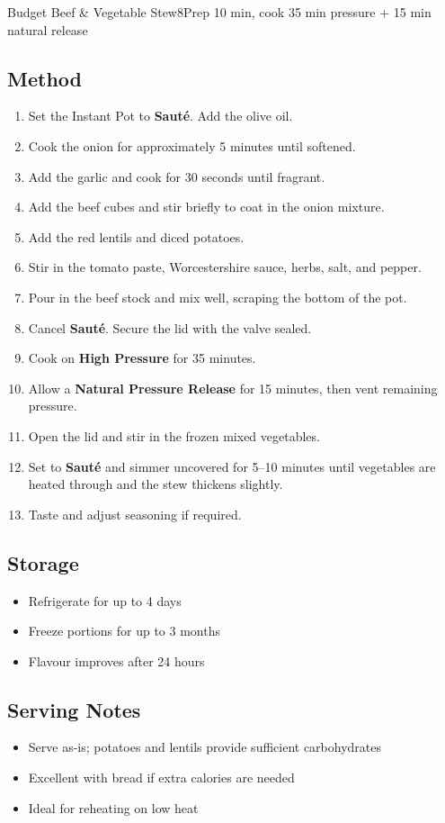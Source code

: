 \begin{recipebox}{Budget Beef \& Vegetable Stew}{8}{Prep 10 min, cook 35 min pressure + 15 min natural release}
\subsection*{Method}
\begin{enumerate}
    \item Set the Instant Pot to \textbf{Sauté}. Add the olive oil.
    \item Cook the onion for approximately 5 minutes until softened.
    \item Add the garlic and cook for 30 seconds until fragrant.
    \item Add the beef cubes and stir briefly to coat in the onion mixture.
    \item Add the red lentils and diced potatoes.
    \item Stir in the tomato paste, Worcestershire sauce, herbs, salt, and pepper.
    \item Pour in the beef stock and mix well, scraping the bottom of the pot.
    \item Cancel \textbf{Sauté}. Secure the lid with the valve sealed.
    \item Cook on \textbf{High Pressure} for 35 minutes.
    \item Allow a \textbf{Natural Pressure Release} for 15 minutes, then vent remaining pressure.
    \item Open the lid and stir in the frozen mixed vegetables.
    \item Set to \textbf{Sauté} and simmer uncovered for 5--10 minutes until vegetables are heated through and the stew thickens slightly.
    \item Taste and adjust seasoning if required.
\end{enumerate}

\subsection*{Storage}
\begin{itemize}
    \item Refrigerate for up to 4 days
    \item Freeze portions for up to 3 months
    \item Flavour improves after 24 hours
\end{itemize}

\subsection*{Serving Notes}
\begin{itemize}
    \item Serve as-is; potatoes and lentils provide sufficient carbohydrates
    \item Excellent with bread if extra calories are needed
    \item Ideal for reheating on low heat
\end{itemize}


\end{recipebox}
